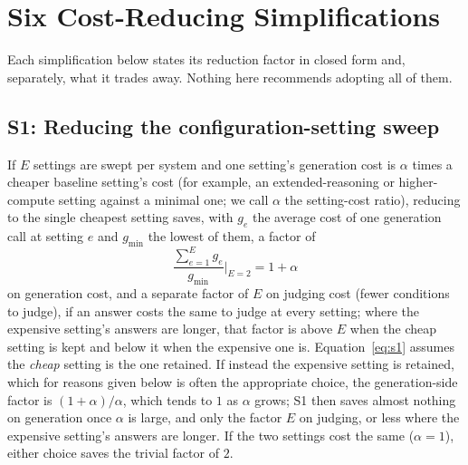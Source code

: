 \documentclass[11pt]{article}
\newcommand{\sectionbreak}{\par\ifdim\pagetotal<5.5\baselineskip\relax\else\clearpage\fi}
\begin{document}
\sectionbreak
\section{Six Cost-Reducing Simplifications}
\label{sec:simplifications}

Each simplification below states its reduction factor in closed form and, separately, what it trades away. Nothing here recommends adopting all of them.

\subsection{S1: Reducing the configuration-setting sweep}

If $E$ settings are swept per system and one setting's generation cost is $\alpha$ times a
cheaper baseline setting's cost (for example, an extended-reasoning or higher-compute
setting against a minimal one; we call $\alpha$ the setting-cost ratio), reducing to the single cheapest setting saves, with $g_e$ the average cost of one generation call at setting $e$ and $g_{\min}$ the lowest of them, a factor of
\begin{equation}
\frac{\sum_{e=1}^{E} g_e}{g_{\min}} \Big|_{E=2} = 1 + \alpha
\label{eq:s1}
\end{equation}
on generation cost, and a separate factor of $E$ on judging cost (fewer conditions to
judge), if an answer costs the same to judge at every setting; where the expensive setting's answers are longer, that factor is above $E$ when the cheap setting is kept and below it when the expensive one is. Equation~\ref{eq:s1} assumes the \emph{cheap} setting is the one retained. If
instead the expensive setting is retained, which for reasons given below is often the appropriate choice, the generation-side factor is $(1+\alpha)/\alpha$, which tends to $1$ as $\alpha$ grows; S1 then saves almost nothing on generation once $\alpha$ is large, and only the factor $E$ on judging, or less where the expensive setting's answers are longer. If the two settings cost the same ($\alpha = 1$), either choice saves the
trivial factor of $2$.
\end{document}
